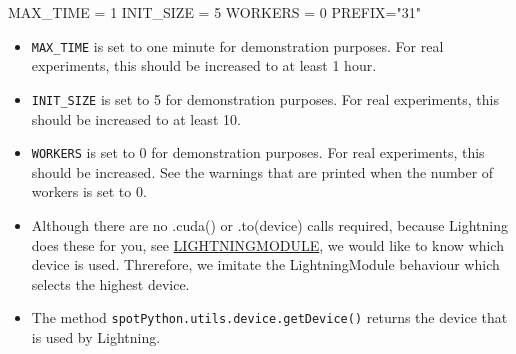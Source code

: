 \documentclass[
  letterpaper,
  DIV=11,
  numbers=noendperiod]{scrreprt}
\newenvironment{Shaded}{\begin{snugshade}}{\end{snugshade}}
\newcommand{\DecValTok}[1]{\textcolor[rgb]{0.68,0.00,0.00}{#1}}
\newcommand{\NormalTok}[1]{\textcolor[rgb]{0.00,0.23,0.31}{#1}}
\newcommand{\OperatorTok}[1]{\textcolor[rgb]{0.37,0.37,0.37}{#1}}
\newcommand{\StringTok}[1]{\textcolor[rgb]{0.13,0.47,0.30}{#1}}
\providecommand{\tightlist}{%
  \setlength{\itemsep}{0pt}\setlength{\parskip}{0pt}}\usepackage{longtable,booktabs,array}
\begin{document}
\begin{Shaded}
\begin{Highlighting}[]
\NormalTok{MAX\_TIME }\OperatorTok{=} \DecValTok{1}
\NormalTok{INIT\_SIZE }\OperatorTok{=} \DecValTok{5}
\NormalTok{WORKERS }\OperatorTok{=} \DecValTok{0}
\NormalTok{PREFIX}\OperatorTok{=}\StringTok{"31"}
\end{Highlighting}
\end{Shaded}

\begin{tcolorbox}[enhanced jigsaw, titlerule=0mm, colbacktitle=quarto-callout-caution-color!10!white, coltitle=black, arc=.35mm, toptitle=1mm, colback=white, left=2mm, opacityback=0, bottomtitle=1mm, bottomrule=.15mm, breakable, opacitybacktitle=0.6, colframe=quarto-callout-caution-color-frame, rightrule=.15mm, toprule=.15mm, leftrule=.75mm, title=\textcolor{quarto-callout-caution-color}{\faFire}\hspace{0.5em}{Caution: Run time and initial design size should be increased for real
experiments}]

\begin{itemize}
\tightlist
\item
  \texttt{MAX\_TIME} is set to one minute for demonstration purposes.
  For real experiments, this should be increased to at least 1 hour.
\item
  \texttt{INIT\_SIZE} is set to 5 for demonstration purposes. For real
  experiments, this should be increased to at least 10.
\item
  \texttt{WORKERS} is set to 0 for demonstration purposes. For real
  experiments, this should be increased. See the warnings that are
  printed when the number of workers is set to 0.
\end{itemize}

\end{tcolorbox}

\begin{tcolorbox}[enhanced jigsaw, titlerule=0mm, colbacktitle=quarto-callout-note-color!10!white, coltitle=black, arc=.35mm, toptitle=1mm, colback=white, left=2mm, opacityback=0, bottomtitle=1mm, bottomrule=.15mm, breakable, opacitybacktitle=0.6, colframe=quarto-callout-note-color-frame, rightrule=.15mm, toprule=.15mm, leftrule=.75mm, title=\textcolor{quarto-callout-note-color}{\faInfo}\hspace{0.5em}{Note: Device selection}]

\begin{itemize}
\tightlist
\item
  Although there are no .cuda() or .to(device) calls required, because
  Lightning does these for you, see
  \href{https://lightning.ai/docs/pytorch/stable/common/lightning_module.html}{LIGHTNINGMODULE},
  we would like to know which device is used. Threrefore, we imitate the
  LightningModule behaviour which selects the highest device.
\item
  The method \texttt{spotPython.utils.device.getDevice()} returns the
  device that is used by Lightning.
\end{itemize}

\end{tcolorbox}
\end{document}
